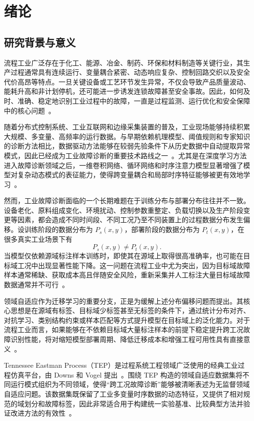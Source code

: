 \chapter{绪论}

\section{研究背景与意义}
流程工业广泛存在于化工、能源、冶金、制药、环保和材料制造等关键行业，其生产过程通常具有连续运行、变量耦合紧密、动态响应复杂、控制回路交织以及安全代价高昂等特点。一旦关键设备或工艺环节发生异常，不仅会导致产品质量波动、能耗升高和非计划停机，还可能进一步诱发连锁故障甚至安全事故。因此，如何及时、准确、稳定地识别工业过程中的故障，一直是过程监测、运行优化和安全保障中的核心问题~\cite{qin2012survey,ge2017review}。

随着分布式控制系统、工业互联网和边缘采集装置的普及，工业现场能够持续积累大规模、多变量、高频率的运行数据。与早期依赖机理模型、阈值规则和专家知识的诊断方法相比，数据驱动方法能够在较弱先验条件下从历史数据中自动提取异常模式，因此已经成为工业故障诊断的重要技术路线之一~\cite{taqvi2021review,yu2023challenges}。尤其是在深度学习方法进入故障诊断领域之后，一维卷积网络、循环网络和时序注意力模型显著增强了模型对复杂动态模式的表征能力，使得跨变量耦合和局部时序特征能够被更有效地学习~\cite{wu2018dcnn}。

然而，工业故障诊断面临的一个长期难题在于训练分布与部署分布往往并不一致。设备老化、原料组成变化、环境扰动、控制参数重整定、负载切换以及生产阶段变更等因素，都会造成不同时间段、不同工况乃至不同装置上的过程数据分布发生偏移。设训练阶段的数据分布为 $P_s(x,y)$，部署阶段的数据分布为 $P_t(x,y)$，在很多真实工业场景下有
\begin{equation}
P_s(x,y)\neq P_t(x,y).
\end{equation}
当模型仅依赖源域标注样本训练时，即使其在源域上取得很高准确率，也可能在目标域工况中出现显著性能下降。这一问题在流程工业中尤为突出，因为目标域故障样本通常稀缺、获取成本高且伴随安全风险，重新采集并人工标注大量目标域故障数据通常并不可行~\cite{pan2009survey,wu2020transfer}。

领域自适应作为迁移学习的重要分支，正是为缓解上述分布偏移问题而提出。其核心思想是在源域有标签、目标域少标签甚至无标签的条件下，通过统计分布对齐、对抗学习、类别结构约束或样本匹配等方式提升模型在目标域上的泛化能力。对于流程工业而言，如果能够在不依赖目标域大量标注样本的前提下稳定提升跨工况故障识别性能，将对缩短模型部署周期、降低迁移成本和增强工程可用性具有直接意义~\cite{wang2020lda,qin2023dynamic}。

Tennessee Eastman Process（TEP）是过程系统工程领域广泛使用的经典工业过程仿真平台，由 Downs 和 Vogel 提出~\cite{downs1993plant}。围绕 TEP 构造的领域自适应数据集将不同运行模式组织为不同领域，使得“跨工况故障诊断”能够被清晰表述为无监督领域自适应问题。该数据集既保留了工业多变量时序数据的动态特征，又提供了相对规范的域划分和故障标签，因此非常适合用于构建统一实验基准、比较典型方法并验证改进方法的有效性~\cite{montesuma2023benchmark}。

